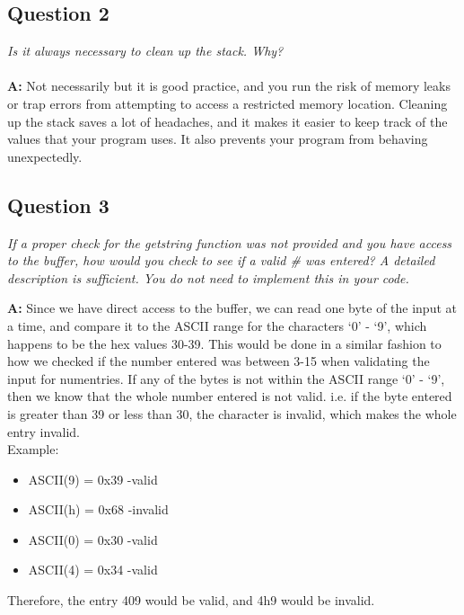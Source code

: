 \documentclass[letterpaper]{article}
\begin{document}
    \subsection{Question 2}
      \textit{Is it always necessary to clean up the stack. Why?}
      \\ \\
      \noindent\textbf{A:}
      Not necessarily but it is good practice, and you run the risk of memory leaks
      or trap errors from attempting to access a restricted memory location.
      Cleaning up the stack saves a lot of headaches, and it makes it easier to keep
      track of the values that your program uses. It also prevents
      your program from behaving unexpectedly.

      \subsection{Question 3} \textit{If a proper check for the getstring
      function was not provided and you have access to the buffer, how would you
      check to see if a valid \# was entered? A detailed description is
      sufficient. You do not need to implement this in your code.
    }

      \noindent\textbf{A:}
      Since we have direct access to the buffer, we can read one byte of the input at a time,
      and compare it to the ASCII range for the characters `0' - `9', which happens to be
      the hex values 30-39. This would be done in a similar fashion to how we checked
      if the number entered was between 3-15 when validating the input for numentries.
      If any of the bytes is not within the ASCII range `0' - `9', then we
      know that the whole number entered is not valid. i.e. if the byte entered
      is greater than 39 or less than 30, the character is invalid, which makes the whole
      entry invalid. \\
      Example:
      \begin{itemize}
        \item ASCII(9) = 0x39 -valid
        \item ASCII(h) = 0x68 -invalid
        \item ASCII(0) = 0x30 -valid
        \item ASCII(4) = 0x34 -valid
      \end{itemize}
      Therefore, the entry 409 would be valid, and 4h9 would be invalid.
\end{document}
